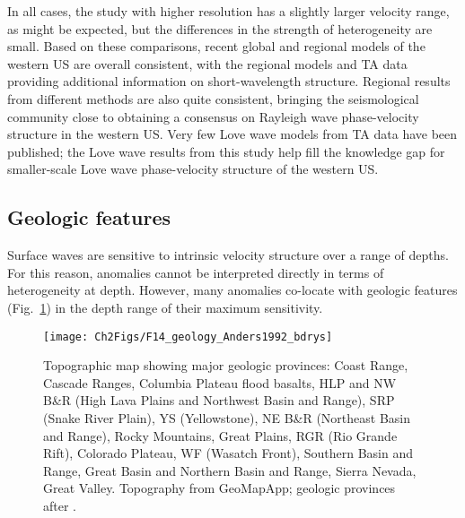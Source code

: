 \documentclass[12pt,oneside]{book}
\begin{document}
In all cases, the study with higher resolution has a slightly larger velocity range, as might be expected, but the differences in the strength of heterogeneity are small. Based on these comparisons, recent global and regional models of the western US are overall consistent, with the regional models and TA data providing additional information on short-wavelength structure. Regional results from different methods are also quite consistent, bringing the seismological community close to obtaining a consensus on Rayleigh wave phase-velocity structure in the western US. Very few Love wave models from TA data have been published; the Love wave results from this study help fill the knowledge gap for smaller-scale Love wave phase-velocity structure of the western US.  

\subsection{Geologic features}\label{sec:geology}

Surface waves are sensitive to intrinsic velocity structure over a range of depths. For this reason, anomalies cannot be interpreted directly in terms of heterogeneity at depth. However, many anomalies co-locate with geologic features (Fig.~\ref{figpv:geology}) in the depth range of their maximum sensitivity.

\begin{figure} 
\begin{center}
\texttt{[image: Ch2Figs/F14\_geology\_Anders1992\_bdrys]} 
\caption[Major geologic features in the western United States]{Topographic map showing major geologic provinces: Coast Range, Cascade Ranges, Columbia Plateau flood basalts, HLP and NW B\&R (High Lava Plains and Northwest Basin and Range), SRP (Snake River Plain), YS (Yellowstone), NE B\&R (Northeast Basin and Range), Rocky Mountains, Great Plains, RGR (Rio Grande Rift), Colorado Plateau, WF (Wasatch Front), Southern Basin and Range, Great Basin and Northern Basin and Range, Sierra Nevada, Great Valley. Topography from GeoMapApp; geologic provinces after \citet{Simpson1992}. } \label{figpv:geology}
\end{center}
\end{figure}
%
\end{document}
